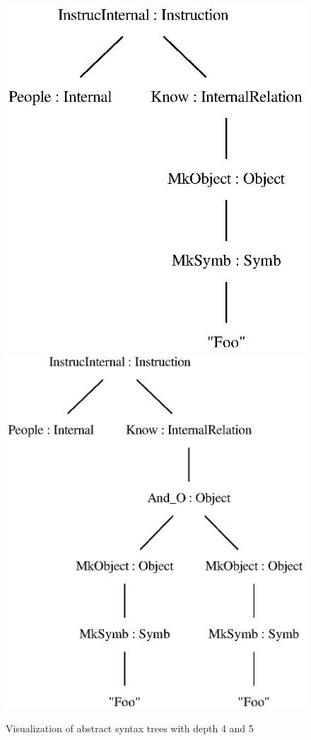 \begin{figure}[H]
\includegraphics[scale=0.6,keepaspectratio,valign=t]{./gfx/depth4}
\includegraphics[scale=0.6,keepaspectratio,valign=t]{./gfx/depth5}
\caption{Visualization of abstract syntax trees with depth 4 and 5\label{fig:asts-depths}}
\end{figure}


